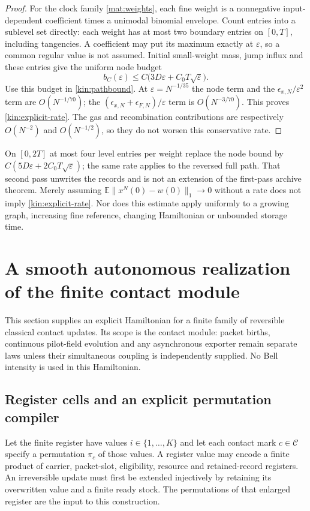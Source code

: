 \documentclass[11pt]{article}
\theoremstyle{definition}\newtheorem{definition}[theorem]{Definition}
\theoremstyle{remark}\newtheorem{remark}[theorem]{Remark}
\begin{document}
\begin{proof}
For the clock family \eqref{mat:weights}, each fine weight is a
nonnegative input-dependent coefficient times a unimodal binomial
envelope.  Count entries into a sublevel set directly: each weight has
at most two boundary entries on $[0,T]$, including tangencies.  A
coefficient may put its maximum exactly at $\varepsilon$, so a common
regular value is not assumed.  Initial small-weight mass, jump influx
and these entries give the uniform node budget
\[
 b_C(\varepsilon)\le C\bigl(3D\varepsilon+C_0T\sqrt\varepsilon\bigr).
\]
Use this budget in \eqref{kin:pathbound}.  At
$\varepsilon=N^{-1/35}$ the node term and the
$\epsilon_{x,N}/\varepsilon^2$ term are $O(N^{-1/70})$; the
$ (\epsilon_{x,N}+\epsilon_{F,N})/\varepsilon$ term is
$O(N^{-3/70})$.  This proves \eqref{kin:explicit-rate}.
The gas and recombination contributions are respectively $O(N^{-2})$
and $O(N^{-1/2})$, so they do not worsen this conservative rate.
\end{proof}

On $[0,2T]$ at most four level entries per weight replace the node bound
by $C(5D\varepsilon+2C_0T\sqrt\varepsilon)$; the same rate applies to
the reversed full path.  That second pass unwrites the records and is
not an extension of the first-pass archive theorem.  Merely assuming
$\mathbb E\|x^N(0)-w(0)\|_1\to0$ without a rate does not imply
\eqref{kin:explicit-rate}.  Nor does this estimate apply uniformly to a
growing graph, increasing fine reference, changing Hamiltonian or unbounded
storage time.

\section{A smooth autonomous realization of the finite contact module}
\label{mech:section}
\label{app:mechanical}

This section supplies an explicit Hamiltonian for a finite family of reversible
classical contact updates. Its scope is the contact module: packet births,
continuous pilot-field evolution and any asynchronous exporter remain separate
laws unless their simultaneous coupling is independently supplied. No Bell
intensity is used in this Hamiltonian.

\subsection{Register cells and an explicit permutation compiler}

Let the finite register have values $i\in\{1,\ldots,K\}$ and let each contact mark
$c\in\mathcal C$ specify a permutation $\pi_c$ of those values. A register value
may encode a finite product of carrier, packet-slot, eligibility, resource and
retained-record registers. An irreversible update must first be extended
injectively by retaining its overwritten value and a finite ready stock.
The permutations of that enlarged register are the input to this construction.
\end{document}
